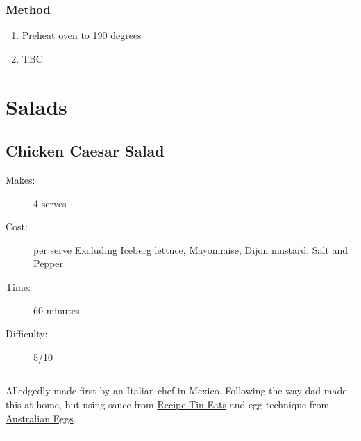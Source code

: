 \documentclass[]{article}
\begin{document}
\subsubsection*{\Large Method}
\begin{enumerate}[font=\huge\color{accent}]
	\item Preheat oven to 190 degrees
	\item TBC
\end{enumerate}
\newpage
{}
\section*{\center\Huge\color{accent}Salads}
\label{cat:Salads}
\label{rec:Chicken Caesar Salad}
\subsection*{\center\huge Chicken Caesar Salad}
\begin{description}
\item[Makes:] 4 serves
\item[Cost:]  per serve Excluding Iceberg lettuce, Mayonnaise, Dijon mustard, Salt and Pepper
\item[Time:] 60 minutes
\item[Difficulty:] 5/10
\end{description}
\vspace{0.2cm}\hrule\vspace{0.5cm}
\begin{adjustwidth}{0.5 cm}{0.5 cm}

Alledgedly made first by an Italian chef in Mexico. Following the way dad made this at home, but using sauce from \href{https://www.recipetineats.com/chicken-caesar-salad/}{Recipe Tin Eats} and egg technique from \href{https://www.australianeggs.org.au/recipes-and-cooking/easy-boiled-eggs}{Australian Eggs}. \hfill{}\color{black}

\end{adjustwidth}
\vspace{0.5cm}\hrule
\end{document}
